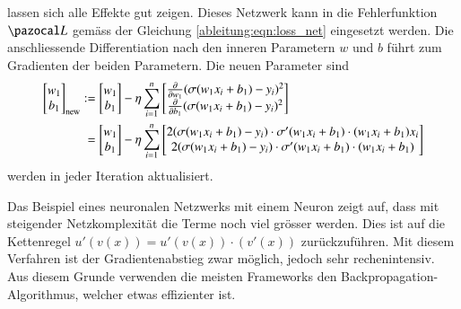 lassen sich alle Effekte gut zeigen.
Dieses Netzwerk kann in die Fehlerfunktion $\Lb$ gemäss der Gleichung
\eqref{ableitung:eqn:loss_net} eingesetzt werden.
Die anschliessende Differentiation nach den inneren Parametern $w$
und $b$ führt zum Gradienten der beiden Parametern.
Die neuen Parameter sind
\begin{align}
\begin{bmatrix}w_{1}\\b_{1}\end{bmatrix}_{\text{new}}
&:=
{\begin{bmatrix}w_{1}\\b_{1}\end{bmatrix}}
-\eta
\sum_{i=1}^n
{\begin{bmatrix}
{\frac {\partial }{\partial w_{1}}}(\sigma(w_{1}x_{i}+b_{1})-y_{i})^{2}\\
{\frac {\partial }{\partial b_{1}}}(\sigma(w_{1}x_{i}+b_{1})-y_{i})^{2}\end{bmatrix}}
\notag
\\
&\phantom{:}=
{\begin{bmatrix}w_{1}\\b_{1}\end{bmatrix}}
-
\eta
\sum_{i=1}^n
{\begin{bmatrix}2(\sigma(w_{1}x_{i}+b_{1}) - y_i) \cdot \sigma'(w_{1}x_{i}+b_{1}) \cdot (w_{1}x_{i}+b_{1}) x_{i} \\2(\sigma(w_{1}x_{i}+b_{1}) - y_i) \cdot \sigma'(w_{1}x_{i}+b_{1}) \cdot (w_{1}x_{i}+b_{1}) \end{bmatrix}}
\end{align}
werden in jeder Iteration aktualisiert.

Das Beispiel eines neuronalen Netzwerks mit einem Neuron zeigt auf,
dass mit steigender Netzkomplexität die Terme noch viel grösser werden.
Dies ist auf die Kettenregel $u'(v(x)) = u'(v(x)) \cdot (v'(x))$ zurückzuführen.
Mit diesem Verfahren ist der Gradientenabstieg zwar möglich, jedoch sehr rechenintensiv.
Aus diesem Grunde verwenden die meisten Frameworks den
Back\-pro\-pa\-ga\-tion-Al\-go\-rith\-mus, welcher etwas effizienter ist.
